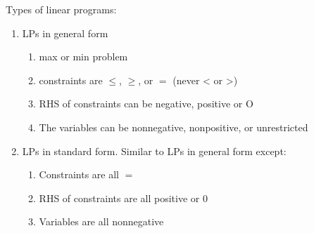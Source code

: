\documentclass{article}
\begin{document}
Types of linear programs: \\
\begin{enumerate}
    \item LPs in general form
    \begin{enumerate}
        \item max or min problem
        \item constraints are \(\leq\), \(\geq\), or \(=\) (never < or >) 
        \item RHS of constraints can be negative, positive or O 
        \item The variables can be nonnegative, nonpositive, or unrestricted
    \end{enumerate}
    \item LPs in standard form. Similar to LPs in general form except:
    \begin{enumerate}
        \item Constraints are all \(=\)
        \item RHS of constraints are all positive or 0
        \item Variables are all nonnegative 
    \end{enumerate}
\end{enumerate}
\end{document}
